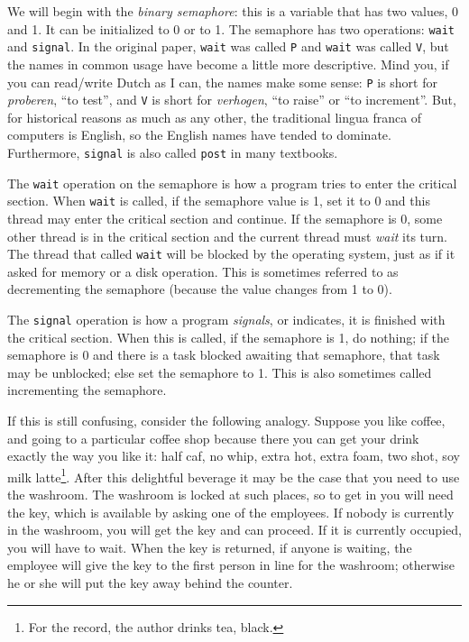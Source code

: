 We will begin with the \textit{binary semaphore}: this is a variable that has two values, 0 and 1. It can be initialized to 0 or to 1. The semaphore has two operations: \texttt{wait} and \texttt{signal}. In the original paper, \texttt{wait} was called \texttt{P} and \texttt{wait} was called \texttt{V}, but the names in common usage have become a little more descriptive. Mind you, if you can read/write Dutch as I can, the names make some sense: \texttt{P} is short for \textit{proberen}, ``to test'', and \texttt{V} is short for \textit{verhogen}, ``to raise'' or ``to increment''. But, for historical reasons as much as any other, the traditional lingua franca of computers is English, so the English names have tended to dominate. Furthermore, \texttt{signal} is also called \texttt{post} in many textbooks.

The \texttt{wait} operation on the semaphore is how a program tries to enter the critical section. When \texttt{wait} is called, if the semaphore value is 1, set it to 0 and this thread may enter the critical section and continue. If the semaphore is 0, some other thread is in the critical section and the current thread must \textit{wait} its turn. The thread that called \texttt{wait} will be blocked by the operating system, just as if it asked for memory or a disk operation. This is sometimes referred to as decrementing the semaphore (because the value changes from 1 to 0).

The \texttt{signal} operation is how a program \textit{signals}, or indicates, it is finished with the critical section. When this is called, if the semaphore is 1, do nothing; if the semaphore is 0 and there is a task blocked awaiting that semaphore, that task may be unblocked; else set the semaphore to 1. This is also sometimes called incrementing the semaphore.

If this is still confusing, consider the following analogy. Suppose you like coffee, and going to a particular coffee shop because there you can get your drink exactly the way you like it: half caf, no whip, extra hot, extra foam, two shot, soy milk latte\footnote{For the record, the author drinks tea, black.}. After this delightful beverage it may be the case that you need to use the washroom. The washroom is locked at such places, so to get in you will need the key, which is available by asking one of the employees. If nobody is currently in the washroom, you will get the key and can proceed. If it is currently occupied, you will have to wait. When the key is returned, if anyone is waiting, the employee will give the key to the first person in line for the washroom; otherwise he or she will put the key away behind the counter.

